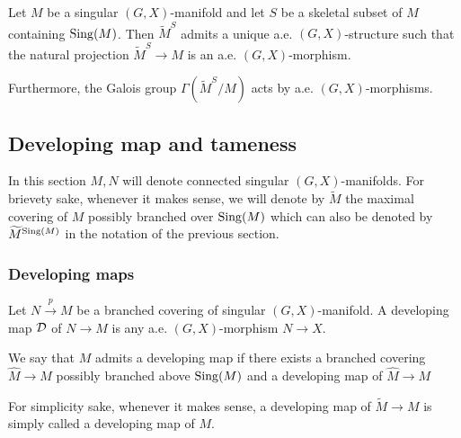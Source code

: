 					\begin{cor} Let $M$ be a singular $(G,X)$-manifold and let $S$ be a skeletal subset of $M$ containing $\mathrm{Sing}(M)$. Then $\widetilde M^S$ admits a unique a.e. $(G,X)$-structure such that the natural projection $\widetilde M^S\rightarrow M$ is an a.e. $(G,X)$-morphism.
					
					Furthermore, the Galois group $\Gamma(\widetilde M^S/M)$ acts by a.e. $(G,X)$-morphisms. 
					 
					\end{cor}








\subsection{Developing map and tameness}


In this section $M,N$ will denote connected singular $(G,X)$-manifolds. 
For brievety sake, whenever it makes sense, we will denote by $\widetilde M$ the maximal covering of $M$ possibly branched over $\mathrm{Sing}(M)$ which can also be denoted by $\widetilde M^{\mathrm{Sing}(M)}$ in the notation of the previous section. 




% 

\subsubsection{Developing maps}
\begin{defi}
  Let $N\xrightarrow{p} M$ be a branched covering of singular $(G,X)$-manifold.
  A developing map $\mathcal{D}$ of $N\rightarrow M$ is any a.e. $(G,X)$-morphism $N \rightarrow X$. 
  
  We say that $M$ admits a developing map if there exists a branched covering $\widehat M \rightarrow M$ possibly branched above $\mathrm{Sing}(M)$ and a developing map of $\widehat M \rightarrow M$
  
   For simplicity sake, whenever it makes sense, a developing map of $\widetilde M\rightarrow M$ is simply called a developing map of $M$. 
  \end{defi}





